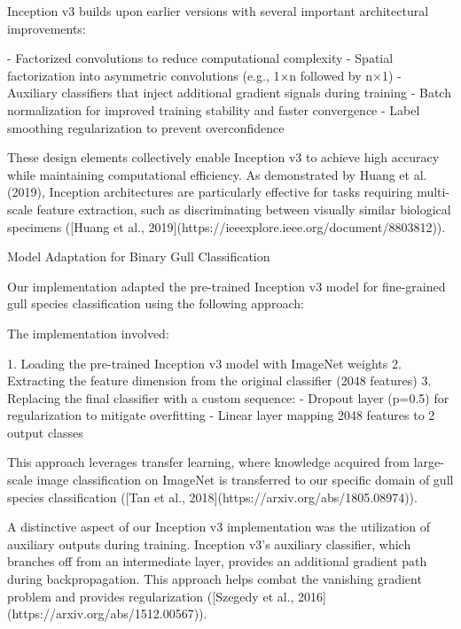 \documentclass[a4paper,12pt]{article}
\begin{document}
Inception v3 builds upon earlier versions with several important architectural improvements:

- Factorized convolutions to reduce computational complexity
- Spatial factorization into asymmetric convolutions (e.g., 1×n followed by n×1)
- Auxiliary classifiers that inject additional gradient signals during training
- Batch normalization for improved training stability and faster convergence
- Label smoothing regularization to prevent overconfidence

These design elements collectively enable Inception v3 to achieve high accuracy while maintaining computational efficiency. As demonstrated by Huang et al. (2019), Inception architectures are particularly effective for tasks requiring multi-scale feature extraction, such as discriminating between visually similar biological specimens ([Huang et al., 2019](https://ieeexplore.ieee.org/document/8803812)).

 Model Adaptation for Binary Gull Classification

Our implementation adapted the pre-trained Inception v3 model for fine-grained gull species classification using the following approach:


The implementation involved:

1. Loading the pre-trained Inception v3 model with ImageNet weights
2. Extracting the feature dimension from the original classifier (2048 features)
3. Replacing the final classifier with a custom sequence:
   - Dropout layer (p=0.5) for regularization to mitigate overfitting
   - Linear layer mapping 2048 features to 2 output classes

This approach leverages transfer learning, where knowledge acquired from large-scale image classification on ImageNet is transferred to our specific domain of gull species classification ([Tan et al., 2018](https://arxiv.org/abs/1805.08974)).

A distinctive aspect of our Inception v3 implementation was the utilization of auxiliary outputs during training. Inception v3's auxiliary classifier, which branches off from an intermediate layer, provides an additional gradient path during backpropagation. This approach helps combat the vanishing gradient problem and provides regularization ([Szegedy et al., 2016](https://arxiv.org/abs/1512.00567)).
\end{document}
